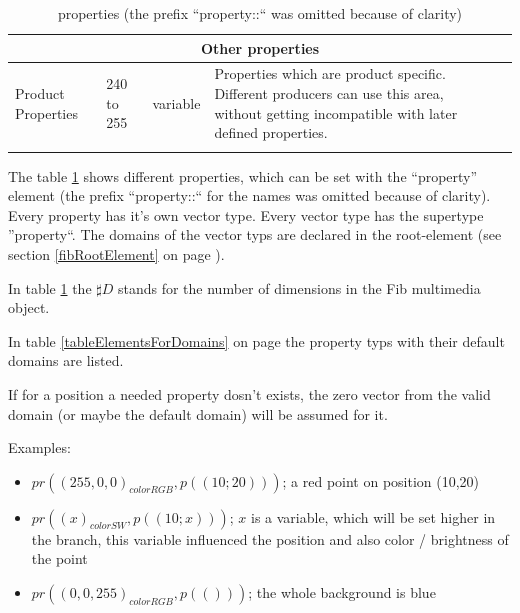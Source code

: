 \begin{center}
\begin{longtable}{|p{25mm}|p{6mm}|p{6mm}|p{50mm}|p{35mm}|}
	\multicolumn{5}{|c|}{\textbf{Other properties}}\\\hline
	Product Properties & 240 to 255 & va\-ri\-able & Properties which are product specific. Different producers can use this area, without getting incompatible with later defined properties. & \\\hline

\caption{properties (the prefix ``property::`` was omitted because of clarity)}
\label{tablePropertyNamen}
\end{longtable}
\end{center}




The table \ref{tablePropertyNamen} shows different properties, which can be set with the ``property'' element (the prefix ``property::`` for the names was omitted because of clarity). Every property has it's own vector type. Every vector type has the supertype ''property``. The domains of the vector typs are declared in the root-element (see section \ref{fibRootElement} on page \pageref{fibRootElement}).

In table \ref{tablePropertyNamen} the $\sharp D$ stands for the number of dimensions in the Fib multimedia object.

In table \ref{tableElementsForDomains} on page \pageref{tableElementsForDomains} the property typs with their default domains are listed.

If for a position a needed property dosn't exists, the zero vector from the valid domain (or maybe the default domain) will be assumed for it.

\bigskip\noindent
Examples:
\begin{itemize}
 \item $pr( (255, 0, 0)_{colorRGB}, p((10;20)) )$; a red point on position (10,20)
 \item $pr( (x)_{colorSW}, p((10;x)) )$; $x$ is a variable, which will be set higher in the branch, this variable influenced the position and also color / brightness of the point
 \item $pr( ( 0, 0, 255)_{colorRGB}, p(()) )$; the whole background is blue
\end{itemize}


